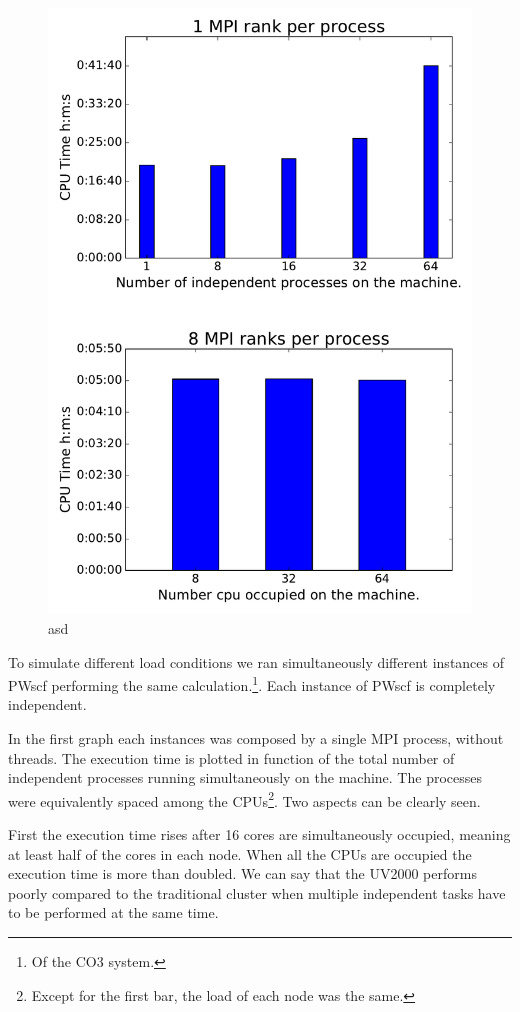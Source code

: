 \documentclass[a4paper,12pt]{article}
\newcommand\CO{CO3 }
\begin{document}
\begin{figure}[hhh!]
\begin{center}
	\includegraphics[width=0.7\linewidth]{sgiLoad.pdf}	
	\caption{asd}
	\label{fig:sgiLoad}
\end{center}
\end{figure}

To simulate different load conditions we ran simultaneously different instances of PWscf performing the same calculation.\footnote{Of the \CO system.}. Each instance of PWscf is completely independent.

In the first graph each instances was composed by a single MPI process, without threads. 
The execution time is plotted in function of the total number of independent processes running simultaneously on the machine.
The processes were equivalently spaced among the CPUs\footnote{Except for the first bar, the load of each node was the same.}.
Two aspects can be clearly seen.

First the execution time rises after 16 cores are simultaneously occupied, meaning at least half of the cores in each node.
When all the CPUs are occupied the execution time is more than doubled. 
We can say that the UV2000 performs poorly compared to the traditional cluster when multiple independent tasks have to be performed at the same time.
\end{document}
